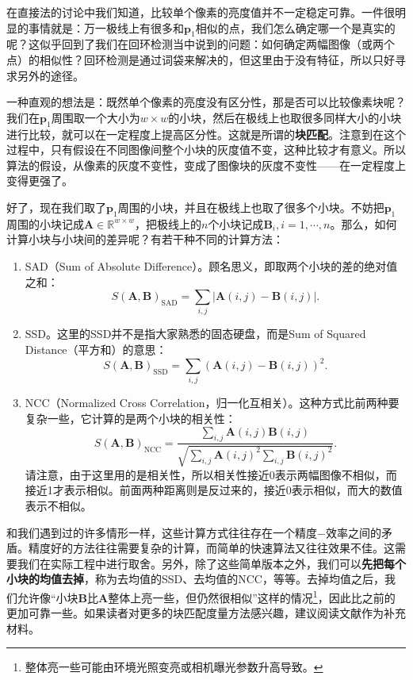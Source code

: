 在直接法的讨论中我们知道，比较单个像素的亮度值并不一定稳定可靠。一件很明显的事情就是：万一极线上有很多和$\bm{p}_1$相似的点，我们怎么确定哪一个是真实的呢？这似乎回到了我们在回环检测当中说到的问题：如何确定两幅图像（或两个点）的相似性？回环检测是通过词袋来解决的，但这里由于没有特征，所以只好寻求另外的途径。

一种直观的想法是：既然单个像素的亮度没有区分性，那是否可以比较像素块呢？我们在$\bm{p}_1$周围取一个大小为$w \times w$的小块，然后在极线上也取很多同样大小的小块进行比较，就可以在一定程度上提高区分性。这就是所谓的\textbf{块匹配}。注意到在这个过程中，只有假设在不同图像间整个小块的灰度值不变，这种比较才有意义。所以算法的假设，从像素的灰度不变性，变成了图像块的灰度不变性——在一定程度上变得更强了。

好了，现在我们取了$\bm{p}_1$周围的小块，并且在极线上也取了很多个小块。不妨把$\bm{p}_1$周围的小块记成$\bm{A} \in \mathbb{R}^{w \times w}$，把极线上的$n$个小块记成$\bm{B}_i, i=1, \cdots, n$。那么，如何计算小块与小块间的差异呢？有若干种不同的计算方法：

\begin{enumerate}
	\item SAD（Sum of Absolute Difference）。顾名思义，即取两个小块的差的绝对值之和：
	\begin{equation}
	S( \bm{A}, \bm{B} )_{\mathrm{SAD}} = \sum_{i,j} | \bm{A}(i,j) - \bm{B}(i,j) |.
	\end{equation}
	\item SSD。这里的SSD并不是指大家熟悉的固态硬盘，而是Sum of Squared Distance（平方和）的意思：
	\begin{equation}
	S( \bm{A}, \bm{B} )_{\mathrm{SSD}} = \sum_{i,j} \left( \bm{A}(i,j) - \bm{B}(i,j) \right)^2.
	\end{equation}
	\item NCC（Normalized Cross Correlation，归一化互相关）。这种方式比前两种要复杂一些，它计算的是两个小块的相关性：
	\begin{equation}
	S( \bm{A}, \bm{B} )_{\mathrm{NCC}} = \frac{{\sum\limits_{i,j} {\bm{A}(i,j)\bm{B}(i,j)} }}{{\sqrt {\sum\limits_{i,j} {\bm{A}{{(i,j)}^2}\sum\limits_{i,j} {\bm{B}{{(i,j)}^2}} } } }}.
	\end{equation}
	请注意，由于这里用的是相关性，所以相关性接近0表示两幅图像不相似，而接近1才表示相似。前面两种距离则是反过来的，接近0表示相似，而大的数值表示不相似。
\end{enumerate}

和我们遇到过的许多情形一样，这些计算方式往往存在一个精度−效率之间的矛盾。精度好的方法往往需要复杂的计算，而简单的快速算法又往往效果不佳。这需要我们在实际工程中进行取舍。另外，除了这些简单版本之外，我们可以\textbf{先把每个小块的均值去掉}，称为去均值的SSD、去均值的NCC，等等。去掉均值之后，我们允许像“小块$\bm{B}$比$\bm{A}$整体上亮一些，但仍然很相似”这样的情况\footnote{整体亮一些可能由环境光照变亮或相机曝光参数升高导致。}，因此比之前的更加可靠一些。如果读者对更多的块匹配度量方法感兴趣，建议阅读文献\cite{stereo-matching-website, Hirschmuller2007}作为补充材料。

